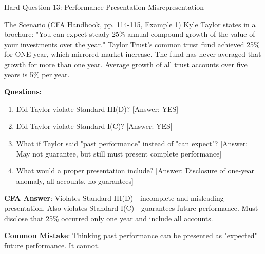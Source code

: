 \documentclass{beamer}
\begin{document}
	\begin{frame}{Hard Question 13: Performance Presentation Misrepresentation}
		\begin{block}{The Scenario (CFA Handbook, pp. 114-115, Example 1)}
			Kyle Taylor states in a brochure: "You can expect steady 25\% annual compound growth of the value of your investments over the year." Taylor Trust's common trust fund achieved 25\% for ONE year, which mirrored market increase. The fund has never averaged that growth for more than one year. Average growth of all trust accounts over five years is 5\% per year.
		\end{block}
		
		\vspace{0.2cm}
		\textbf{Questions:}
		\begin{enumerate}
			\item Did Taylor violate Standard III(D)? \textcolor{cfared}{[Answer: YES]}
			\item Did Taylor violate Standard I(C)? \textcolor{cfared}{[Answer: YES]}
			\item What if Taylor said "past performance" instead of "can expect"? \textcolor{cfared}{[Answer: May not guarantee, but still must present complete performance]}
			\item What would a proper presentation include? \textcolor{cfared}{[Answer: Disclosure of one-year anomaly, all accounts, no guarantees]}
		\end{enumerate}
		
		\vspace{0.2cm}
		\textcolor{cfablue}{\textbf{CFA Answer}}: Violates Standard III(D) - incomplete and misleading presentation. Also violates Standard I(C) - guarantees future performance. Must disclose that 25\% occurred only one year and include all accounts.
		
		\vspace{0.1cm}
		\textcolor{cfared}{\textbf{Common Mistake}}: Thinking past performance can be presented as "expected" future performance. It cannot.
	\end{frame}
	
\end{document}
